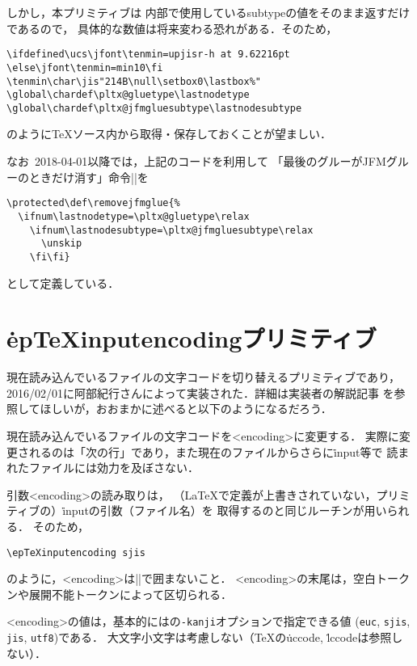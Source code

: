 \documentclass[a4paper,11pt,nomag]{jsarticle}
\begin{document}
しかし，本プリミティブは
\epTeX 内部で使用しているsubtypeの値をそのまま返すだけであるので，
具体的な数値は将来変わる恐れがある．そのため，
\begin{verbatim}
\ifdefined\ucs\jfont\tenmin=upjisr-h at 9.62216pt
\else\jfont\tenmin=min10\fi
\tenmin\char\jis"214B\null\setbox0\lastbox%"
\global\chardef\pltx@gluetype\lastnodetype
\global\chardef\pltx@jfmgluesubtype\lastnodesubtype
\end{verbatim}
のように\TeX ソース内から取得・保存しておくことが望ましい．

\medskip
なお\pLaTeX~2018-04-01以降では，上記のコードを利用して
「最後のグルーがJFMグルーのときだけ消す」命令|\removejfmglue|を
\begin{verbatim}
\protected\def\removejfmglue{%
  \ifnum\lastnodetype=\pltx@gluetype\relax
    \ifnum\lastnodesubtype=\pltx@jfmgluesubtype\relax
      \unskip
    \fi\fi}
\end{verbatim}
として定義している．

\section{\.{epTeXinputencoding}プリミティブ}
現在読み込んでいるファイルの文字コードを切り替えるプリミティブであり，
2016/02/01に阿部紀行さんによって実装された．詳細は実装者の解説記事
\cite{eptexinputenc}を参照してほしいが，おおまかに述べると以下のようになるだろう．

\begin{cslist}
  現在読み込んでいるファイルの文字コードを<encoding>に変更する．
  実際に変更されるのは「次の行」であり，また現在のファイルからさらに\.{input}等で
  読まれたファイルには効力を及ぼさない．

  引数<encoding>の読み取りは，
  （\LaTeX で定義が上書きされていない，プリミティブの）\.{input}の引数（ファイル名）を
  取得するのと同じルーチンが用いられる．
  そのため，
\begin{verbatim}
\epTeXinputencoding sjis
\end{verbatim}
  のように，<encoding>は|{}|で囲まないこと．
  <encoding>の末尾は，空白トークンや展開不能トークンによって区切られる．

  <encoding>の値は，基本的には\pTeX の\texttt{-kanji}オプションで指定できる値
  (\texttt{euc}, \texttt{sjis}, \texttt{jis}, \texttt{utf8})である．
  大文字小文字は考慮しない（\TeX の\.{uccode}, \.{lccode}は参照しない）．
\end{cslist}
\end{document}
